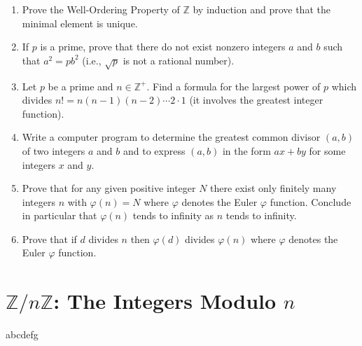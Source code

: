 \begin{enumerate}
    \item Prove the Well-Ordering Property of $\mathbb{Z}$ by induction and prove that the minimal element is unique.

    \item If $p$ is a prime, prove that there do not exist nonzero integers $a$ and $b$ such that $a^2 = p b^2$ (i.e., $\sqrt{p}$ is not a rational number).

    \item Let $p$ be a prime and $n \in \mathbb{Z}^+$. Find a formula for the largest power of $p$ which divides $n! = n(n - 1)(n - 2)\cdots 2 \cdot 1$ (it involves the greatest integer function).

    \item Write a computer program to determine the greatest common divisor $(a, b)$ of two integers $a$ and $b$ and to express $(a, b)$ in the form $ax + by$ for some integers $x$ and $y$.

    \item Prove that for any given positive integer $N$ there exist only finitely many integers $n$ with $\varphi(n) = N$ where $\varphi$ denotes the Euler $\varphi$ function. Conclude in particular that $\varphi(n)$ tends to infinity as $n$ tends to infinity.

    \item Prove that if $d$ divides $n$ then $\varphi(d)$ divides $\varphi(n)$ where $\varphi$ denotes the Euler $\varphi$ function.
\end{enumerate}
\section{$\mathbb{Z}/n\mathbb{Z}$: The Integers Modulo $n$}
abcdefg